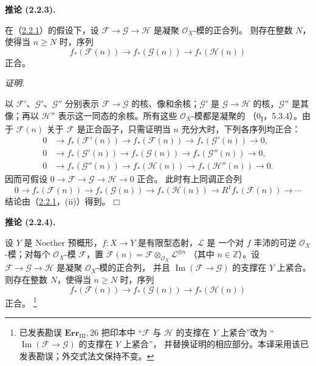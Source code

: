 \documentclass[UTF8,fontset=none,11pt,oneside,openany]{ctexbook}
\providecommand{\square}{\mdlgwhtsquare}
\newcommand{\SourceCorrectionNote}[1]{\footnote{#1}}
\newenvironment{corollary}[1][]{%
  \par\medskip\noindent\textbf{推论 (#1).}\ %
}{\par}
\newenvironment{proof}{%
  \par\smallskip\noindent\textit{证明.}\ %
}{\hfill$\square$\par}
\let\EGAOriginalLabel\label
\renewcommand{\label}[1]{\phantomsection\EGAOriginalLabel{#1}}
\begin{document}
\begin{corollary}[2.2.3]
\label{III.2.2.3-fr}
在（\hyperref[III.2.2.1-fr]{2.2.1}）的假设下，设
$\mathcal F\to\mathcal G\to\mathcal H$ 是凝聚 $\mathcal O_X$-模的正合列。
则存在整数 $N$，使得当 $n\geq N$ 时，序列
\[
f_*(\mathcal F(n))\longrightarrow f_*(\mathcal G(n))
\longrightarrow f_*(\mathcal H(n))
\]
正合。
\end{corollary}

\begin{proof}
以 $\mathcal F'$、$\mathcal G'$、$\mathcal G''$ 分别表示
$\mathcal F\to\mathcal G$ 的核、像和余核；$\mathcal G'$ 是
$\mathcal G\to\mathcal H$ 的核，$\mathcal G''$ 是其像；再以
$\mathcal H''$ 表示这一同态的余核。所有这些 $\mathcal O_X$-模都是凝聚的
（0\textsubscript{I}，5.3.4）。由于 $\mathcal F(n)$ 关于 $\mathcal F$
是正合函子，只需证明当 $n$ 充分大时，下列各序列均正合：
\begin{align*}
0&\longrightarrow f_*(\mathcal F'(n))
\longrightarrow f_*(\mathcal F(n))
\longrightarrow f_*(\mathcal G'(n))\longrightarrow0,\\
0&\longrightarrow f_*(\mathcal G'(n))
\longrightarrow f_*(\mathcal G(n))
\longrightarrow f_*(\mathcal G''(n))\longrightarrow0,\\
0&\longrightarrow f_*(\mathcal G''(n))
\longrightarrow f_*(\mathcal H(n))
\longrightarrow f_*(\mathcal H''(n))\longrightarrow0.
\end{align*}
因而可假设 $0\to\mathcal F\to\mathcal G\to\mathcal H\to0$ 正合。
此时有上同调正合列
\[
0\longrightarrow f_*(\mathcal F(n))
\longrightarrow f_*(\mathcal G(n))
\longrightarrow f_*(\mathcal H(n))
\longrightarrow R^1f_*(\mathcal F(n))\longrightarrow\cdots
\]
结论由（\hyperref[III.2.2.1-fr]{2.2.1}，(ii)）得到。
\end{proof}

\begin{corollary}[2.2.4]
\label{III.2.2.4-fr}
设 $Y$ 是 Noether 预概形，$f:X\to Y$ 是有限型态射，$\mathcal L$ 是
一个对 $f$ 丰沛的可逆 $\mathcal O_X$-模；对每个 $\mathcal O_X$-模
$\mathcal F$，置
$\mathcal F(n)=\mathcal F\otimes_{\mathcal O_X}\mathcal L^{\otimes n}$
（其中 $n\in\mathbb Z$）。设
$\mathcal F\to\mathcal G\to\mathcal H$ 是凝聚 $\mathcal O_X$-模的正合列，
并且 $\operatorname{Im}(\mathcal F\to\mathcal G)$ 的支撑在 $Y$ 上紧合。
则存在整数 $N$，使得当 $n\geq N$ 时，序列
\[
f_*(\mathcal F(n))\longrightarrow f_*(\mathcal G(n))
\longrightarrow f_*(\mathcal H(n))
\]
正合。
\SourceCorrectionNote{已发表勘误 $\mathbf{Err}_{\mathrm{III}},26$ 把印本中
“$\mathcal F$ 与 $\mathcal H$ 的支撑在 $Y$ 上紧合”改为
“$\operatorname{Im}(\mathcal F\to\mathcal G)$ 的支撑在 $Y$ 上紧合”，
并替换证明的相应部分。本译采用该已发表勘误；外交式法文保持不变。}
\end{corollary}
\end{document}
